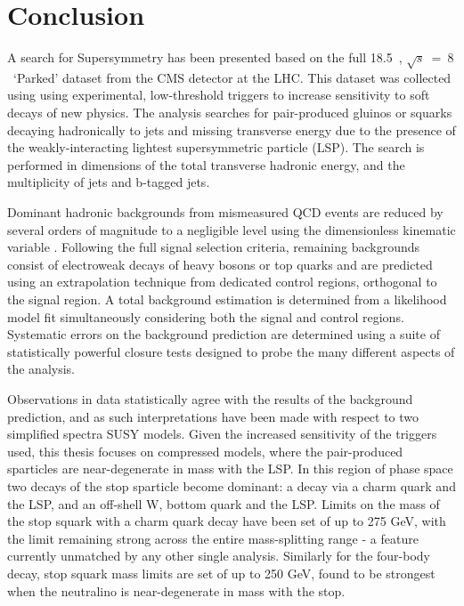 \chapter{Conclusion}
\label{ch:conclusion}

\ifpdf
    \graphicspath{{Chapter10/Figs/Raster/}{Chapter10/Figs/PDF/}{Chapter10/Figs/}}
\else
    \graphicspath{{Chapter10/Figs/Vector/}{Chapter10/Figs/}}
\fi

A search for Supersymmetry has been presented based on the full 18.5~\fb, 
$\sqrt{s}~=~8$~\tev `Parked' dataset from the CMS detector at the LHC.
This dataset was collected using
using experimental, low-threshold triggers to increase sensitivity to soft
decays of new physics. The
analysis searches for pair-produced gluinos or squarks decaying hadronically to
jets and missing transverse energy due to the presence of the weakly-interacting
lightest supersymmetric particle (LSP). The search is performed in dimensions of
the total transverse hadronic energy, and the multiplicity of jets and b-tagged
jets.

Dominant hadronic backgrounds from mismeasured QCD events are reduced by
several orders of magnitude to a negligible level using the dimensionless
kinematic variable \alphat. Following the full signal selection criteria,
remaining backgrounds consist of electroweak decays of
heavy bosons or top quarks and are predicted using an extrapolation technique
from dedicated control regions,
orthogonal to the signal region. A total background estimation is determined
from a likelihood model fit simultaneously considering both the signal and
control regions. Systematic errors on the background prediction are determined
using a suite of statistically powerful closure tests designed to probe the
many different aspects of the analysis.

Observations in data statistically agree with the results of the background
prediction, and as such interpretations have been made with respect to two
simplified spectra SUSY models. Given the increased sensitivity of the triggers
used, this thesis focuses on compressed models, where
the pair-produced sparticles are near-degenerate in mass with the LSP. In this
region of
phase space two decays of the stop sparticle become dominant: a
decay via a charm quark and the LSP, and an off-shell W, bottom quark and the LSP.
Limits on the mass of the stop squark with a charm quark decay have been set
of up to 275 GeV, with the limit remaining strong across the entire
mass-splitting
range - a feature currently unmatched by any other single analysis. Similarly
for the four-body decay, stop squark mass limits are set of up to 250 GeV, found
to be strongest when the neutralino is near-degenerate in mass with the stop.

